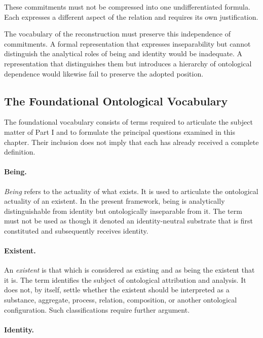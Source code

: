 These commitments must not be compressed into one
undifferentiated formula. Each expresses a different
aspect of the relation and requires its own justification.

The vocabulary of the reconstruction must preserve
this independence of commitments. A formal representation
that expresses inseparability but cannot distinguish
the analytical roles of being and identity would be
inadequate. A representation that distinguishes them
but introduces a hierarchy of ontological dependence
would likewise fail to preserve the adopted position.

\subsection{The Foundational Ontological Vocabulary}

The foundational vocabulary consists of terms required
to articulate the subject matter of Part I and to
formulate the principal questions examined in this
chapter. Their inclusion does not imply that each
has already received a complete definition.

\paragraph{Being.}

\emph{Being} refers to the actuality of what exists.
It is used to articulate the ontological actuality
of an existent. In the present framework, being is
analytically distinguishable from identity but
ontologically inseparable from it. The term must
not be used as though it denoted an identity-neutral
substrate that is first constituted and subsequently
receives identity.

\paragraph{Existent.}

An \emph{existent} is that which is considered as
existing and as being the existent that it is.
The term identifies the subject of ontological
attribution and analysis. It does not, by itself,
settle whether the existent should be interpreted
as a substance, aggregate, process, relation,
composition, or another ontological configuration.
Such classifications require further argument.

\paragraph{Identity.}

